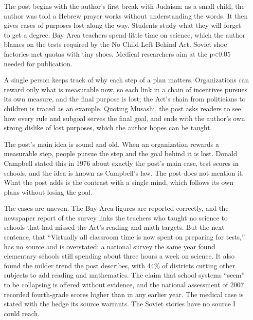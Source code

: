 \begin{afterword}
\summaryhead

The post begins with the author's first break with Judaism: as a small child, the author was told a Hebrew prayer works without understanding the words. It then gives cases of purposes lost along the way. Students study what they will forget to get a degree. Bay Area teachers spend little time on science, which the author blames on the tests required by the No Child Left Behind Act. Soviet shoe factories met quotas with tiny shoes. Medical researchers aim at the p<0.05 needed for publication.

A single person keeps track of why each step of a plan matters. Organizations can reward only what is measurable now, so each link in a chain of incentives pursues its own measure, and the final purpose is lost; the Act's chain from politicians to children is traced as an example. Quoting Musashi, the post asks readers to see how every rule and subgoal serves the final goal, and ends with the author's own strong dislike of lost purposes, which the author hopes can be taught.

\responsehead

The post's main idea is sound and old. When an organization rewards a measurable step, people pursue the step and the goal behind it is lost. Donald Campbell stated this in 1976 about exactly the post's main case, test scores in schools, and the idea is known as Campbell's law. The post does not mention it. What the post adds is the contrast with a single mind, which follows its own plans without losing the goal.

The cases are uneven. The Bay Area figures are reported correctly, and the newspaper report of the survey links the teachers who taught no science to schools that had missed the Act's reading and math targets. But the next sentence, that ``Virtually all classroom time is now spent on preparing for tests,'' has no source and is overstated: a national survey the same year found elementary schools still spending about three hours a week on science. It also found the milder trend the post describes, with 44\% of districts cutting other subjects to add reading and mathematics. The claim that school systems ``seem'' to be collapsing is offered without evidence, and the national assessment of 2007 recorded fourth-grade scores higher than in any earlier year. The medical case is stated with the hedge its source warrants. The Soviet stories have no source I could reach.


\end{afterword}
